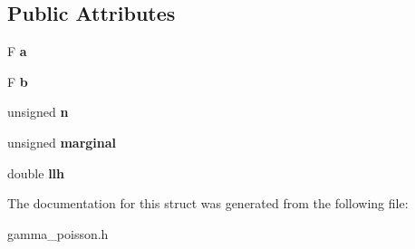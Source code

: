 \subsection*{Public Attributes}
\begin{DoxyCompactItemize}
\item 
\mbox{\label{structcpyp_1_1gamma__poisson_a68b56a587059c287a2fc4ddbef06669f}} 
F {\bfseries a}
\item 
\mbox{\label{structcpyp_1_1gamma__poisson_a9c71a715d296e1b11d515c87a1a7c36e}} 
F {\bfseries b}
\item 
\mbox{\label{structcpyp_1_1gamma__poisson_ab1f0999a68f24cbfbf70378b58cd70cf}} 
unsigned {\bfseries n}
\item 
\mbox{\label{structcpyp_1_1gamma__poisson_a97da2a2108c007671eaa759176682e4e}} 
unsigned {\bfseries marginal}
\item 
\mbox{\label{structcpyp_1_1gamma__poisson_a63caf3ee5fedd0341f44ef17468e8939}} 
double {\bfseries llh}
\end{DoxyCompactItemize}


The documentation for this struct was generated from the following file\+:\begin{DoxyCompactItemize}
\item 
gamma\+\_\+poisson.\+h\end{DoxyCompactItemize}
